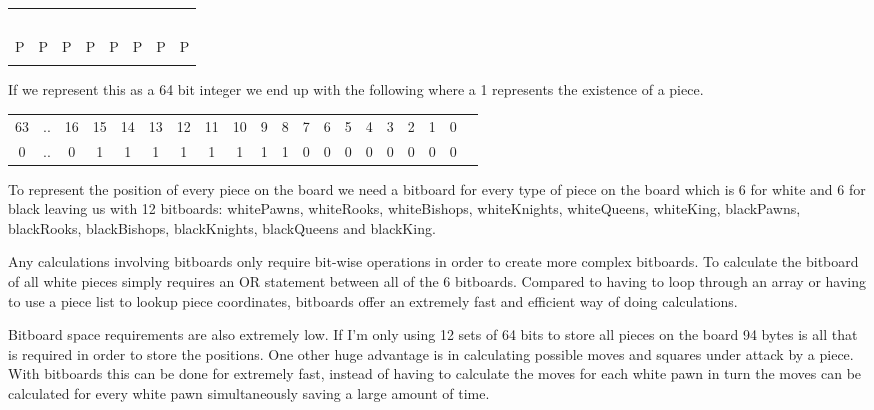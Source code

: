 \documentclass[11pt]{report}
\begin{document}
\begin{table}[H]
\centering
\begin{tabular}{|l|l|l|l|l|l|l|l|}
\hline
  &   &   &   &   &   &   &  \\ \hline
  &   &   &   &   &   &   &  \\ \hline
  &   &   &   &   &   &   &  \\ \hline
  &   &   &   &   &   &   &  \\ \hline
  &   &   &   &   &   &   &  \\ \hline
  &   &   &   &   &   &   &  \\ \hline
P & P & P & P & P & P & P & P \\ \hline
  &   &   &   &   &   &   &  \\ \hline
\end{tabular}
\end{table}

If we represent this as a 64 bit integer we end up with the following where a 1 represents the existence of a piece.
\begin{table}[H]
\begin{tabular}{cccccccccccccccccccc}
63 & .. & 16 & 15 & 14 & 13 & 12 & 11 & 10 & 9 & 8 & 7 & 6 & 5 & 4 & 3 & 2 & 1 & 0 &  \\
0  & .. & 0  & 1  & 1  & 1  & 1  & 1  & 1  & 1 & 1 & 0 & 0 & 0 & 0 & 0 & 0 & 0 & 0 & 
\end{tabular}
\end{table}

To represent the position of every piece on the board we need a bitboard for every type of piece on the board which is 6 for white and 6 for black leaving us with 12 bitboards: whitePawns, whiteRooks, whiteBishops, whiteKnights, whiteQueens, whiteKing, blackPawns, blackRooks, blackBishops, blackKnights, blackQueens and blackKing. \newline

Any calculations involving bitboards only require bit-wise operations in order to create more complex bitboards. To calculate the bitboard of all white pieces simply requires an OR statement between all of the 6 bitboards. Compared to having to loop through an array or having to use a piece list to lookup piece coordinates, bitboards offer an extremely fast and efficient way of doing calculations. \newline

Bitboard space requirements are also extremely low. If I'm only using 12 sets of 64 bits to store all pieces on the board 94 bytes is all that is required in order to store the positions. One other huge advantage is in calculating possible moves and squares under attack by a piece. With bitboards this can be done for extremely fast, instead of having to calculate the moves for each white pawn in turn the moves can be calculated for every white pawn simultaneously saving a large amount of time. \newline
\end{document}
